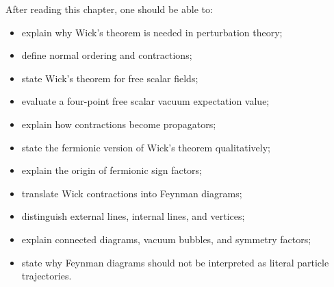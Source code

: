 After reading this chapter, one should be able to:
\begin{itemize}
    \item explain why Wick's theorem is needed in perturbation theory;
    \item define normal ordering and contractions;
    \item state Wick's theorem for free scalar fields;
    \item evaluate a four-point free scalar vacuum expectation value;
    \item explain how contractions become propagators;
    \item state the fermionic version of Wick's theorem qualitatively;
    \item explain the origin of fermionic sign factors;
    \item translate Wick contractions into Feynman diagrams;
    \item distinguish external lines, internal lines, and vertices;
    \item explain connected diagrams, vacuum bubbles, and symmetry factors;
    \item state why Feynman diagrams should not be interpreted as literal
    particle trajectories.
\end{itemize}
